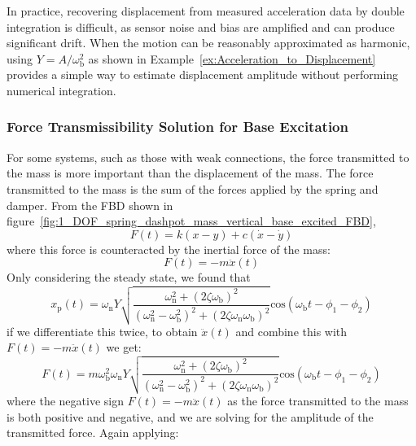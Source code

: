 \documentclass[12pt,letter]{article}
\begin{document}
\begin{note}
In practice, recovering displacement from measured acceleration data by double integration is difficult, as sensor noise and bias are amplified and can produce significant drift. When the motion can be reasonably approximated as harmonic, using $Y = A/\omega_\text{b}^2$ as shown in Example~\ref{ex:Acceleration_to_Displacement} provides a simple way to estimate displacement amplitude without performing numerical integration.
\end{note}

   
 \subsubsection{Force Transmissibility Solution for Base Excitation}
 
  For some systems, such as those with weak connections, the force transmitted to the mass is more important than the displacement of the mass. The force transmitted to the mass is the sum of the forces applied by the spring and damper. From the FBD shown in figure~\ref{fig:1_DOF_spring_dashpot_mass_vertical_base_excited_FBD},
  \begin{equation}
  F(t) = k(x-y) + c(\dot{x} - \dot{y}) 
  \end{equation}
  where this force is counteracted by the inertial force of the mass:
  \begin{equation}
  F(t) = -m\ddot{x}(t)
  \end{equation}
  Only considering the steady state, we found that 
  \begin{equation}
   x_\text{p}(t) =  \omega_\text{n} Y   \sqrt{\frac{\omega_\text{n}^2 + (2 \zeta \omega_\text{b})^2 }{(\omega_\text{n}^2 - \omega_\text{b}^2)^2 +  (2\zeta \omega_\text{n} \omega_\text{b})^2} }  \text{cos}(\omega_\text{b}t - \phi_1 - \phi_2)
  \end{equation} 
  if we differentiate this twice, to obtain $\ddot{x}(t)$ and combine this with $F(t) = -m\ddot{x}(t)$ we get:
  \begin{equation}
   F(t) =  m \omega_\text{b}^2 \omega_\text{n} Y   \sqrt{\frac{\omega_\text{n}^2 + (2 \zeta \omega_\text{b})^2 }{(\omega_\text{n}^2 - \omega_\text{b}^2)^2 +  (2\zeta \omega_\text{n} \omega_\text{b})^2} }  \text{cos}(\omega_\text{b}t - \phi_1 - \phi_2)
  \end{equation} 
  where the negative sign $F(t) = -m\ddot{x}(t)$ as the force transmitted to the mass is both positive and negative, and we are solving for the amplitude of the transmitted force. Again applying:
\end{document}
